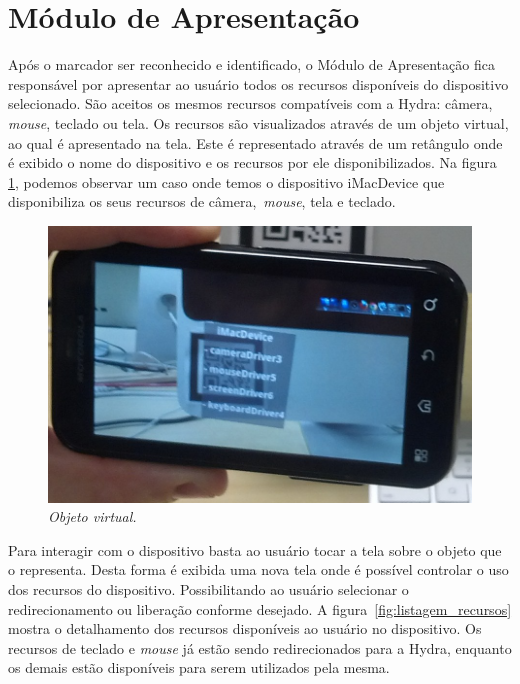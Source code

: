 \section{Módulo de Apresentação}
\label{sec:modulo_apresentacao}

	Após o marcador ser reconhecido e identificado, o Módulo de Apresentação fica responsável por
	apresentar ao usuário todos os recursos disponíveis do dispositivo selecionado. São aceitos os
	mesmos recursos compatíveis com a Hydra: câmera, \textit{mouse}, teclado ou tela. Os recursos são
	visualizados através de um objeto virtual, ao qual é apresentado na tela. Este é representado
	através de um retângulo onde é exibido o nome do dispositivo e os recursos por ele
	disponibilizados. Na figura \ref{fig:objeto_virtual}, podemos observar um caso onde temos o 
	dispositivo iMacDevice que disponibiliza os seus recursos de câmera,~\textit{mouse}, tela e teclado.

	
	\begin{figure}[htb]
		\centering \includegraphics[scale=0.3]{figuras/cap4/objeto_virtual.png}
		\caption{\textit{Objeto virtual.}}
		\label{fig:objeto_virtual} 
	\end{figure}
	
	Para interagir com o dispositivo basta ao usuário tocar a tela sobre o objeto que o representa.
	Desta forma é exibida uma nova tela onde é possível controlar o uso dos recursos do dispositivo.
	Possibilitando ao usuário selecionar o redirecionamento ou liberação conforme desejado. A 
	figura~\ref{fig:listagem_recursos} mostra o detalhamento dos recursos disponíveis ao usuário no 
	dispositivo. Os recursos de teclado e \textit{mouse} já estão sendo redirecionados para a Hydra, 
	enquanto os demais estão disponíveis para serem utilizados pela mesma.
	

